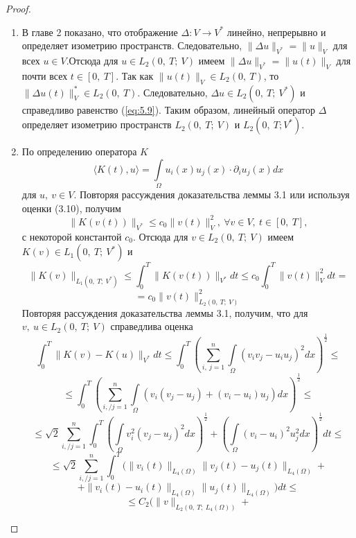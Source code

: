 \begin{proof} ~\\
    \begin{enumerate} 
        \item В главе 2 показано, что отображение $\Delta: V \rightarrow V^\ast$ линейно, непрерывно и определяет изометрию пространств.
        Следовательно, \linebreak $\parallel \Delta u \parallel_{V^\ast} = \parallel u \parallel_V$ для всех $u \in V$.Отсюда для $u \in L_2(0, \ T; \ V)$ имеем
        \linebreak $\parallel \Delta u \parallel_{V^\ast} = \parallel u(t) \parallel_V$ для почти всех $t \in [0, \ T]$.
        Так как $\parallel u(t) \parallel_V \in L_2(0, \ T)$,
        то $\parallel \Delta u(t)\parallel_V^\ast \in L_2(0, \ T)$. Следовательно, $\Delta u \in L_2(0, \ T; \ V^\ast)$ и справедливо
        равенство (\ref{eq:5.9}). Таким образом, линейный оператор $\Delta$ определяет изометрию пространств $L_2(0, \ T; \ V)$ и $L_2(0, \ T; V^\ast)$.
        \item По определению оператора $K$
        $$\langle K(t), u \rangle = \int\limits_\Omega u_i(x )u_j(x) \cdot \partial_i u_j(x) dx$$
        для $u, \ v \in V$. Повторяя рассуждения доказательства леммы 3.1 или используя оценки (3.10), получим
        $$\parallel K(v(t)) \parallel_{V^\ast} \le c_0 \parallel v(t) \parallel^2_V, \ \forall v \in V, \ t \in [0, \ T],$$
        с некоторой константой $c_0$.
        Отсюда для $v \in L_2(0, \ T; \ V)$ имеем $K(v) \in L_1(0, \ T; \ V^\ast)$ и
        $$\parallel K(v)\parallel_{L_1(0, \ T; \ V^*)}\le\int_0^T\parallel K(v(t))\parallel_{V^*}dt\le c_0\int_0^T\parallel v(t)\parallel_V^2dt=$$
        $$=c_0\parallel v(t)\parallel_{L_2(0, \ T; \ V)}^2$$
        Повторяя рассуждения доказательства леммы 3.1, получим, что для $v, \ u \in L_2(0, \ T; \ V)$ справедлива оценка
        $$\int_0^T \parallel K(v)-K(u)\parallel_{V^*}dt\le\int_0^T (\sum_{i, \ j=1}^n\int\limits_\Omega (v_iv_j-u_iu_j)^2dx)^\frac{1}{2}\le$$
        $$\le\int_0^T(\sum_{i, / j=1}^n\int\limits_\Omega (v_i(v_j-u_j)+(v_i-u_i)u_j)dx)^\frac{1}{2}\le$$
        $$\le\sqrt{2}\sum_{i, / j=1}^n\int_0^T(\int\limits_\Omega v_i^2(v_j-u_j)^2dx)^\frac{1}{2}+(\int\limits_\Omega(v_i-u_i)^2u_j^2dx)^\frac{1}{2}dt\le$$
        $$\le\sqrt{2}\sum_{i, / j=1}^n\int_0^T(\parallel v_i(t)\parallel_{L_4(\Omega)}\parallel v_j(t)-u_j(t)\parallel_{L_4(\Omega)}+$$
        $$+\parallel v_i(t)-u_i(t)\parallel_{L_4(\Omega)}\parallel u_j(t)\parallel_{L_4(\Omega)})dt\le$$
        $$\le C_2(\parallel v \parallel_{L_2(0, \ T; \ L_4(\Omega))}+
$$
\end{enumerate}
\end{proof}
